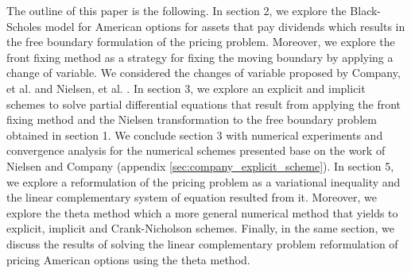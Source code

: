 The outline of this paper is the following. In section 2, we explore the 
Black-Scholes model for American options for assets that pay dividends which results in the free boundary formulation of the pricing problem. Moreover, we explore the front fixing method as a strategy for fixing the moving boundary by applying a change of variable. We considered the changes of variable proposed by Company, et al. \cite*{company_egorova_jodar_2014} and Nielsen, et al. \cite*{nielsen_2001}. In section 3, we explore
an explicit and implicit schemes to solve partial differential equations that 
result from applying the front fixing method and the Nielsen transformation to the free boundary problem obtained in section 1. We conclude section 3 with numerical experiments and convergence analysis for the numerical schemes presented base on the work of Nielsen and Company (appendix \ref{sec:company_explicit_scheme}). In section 5, we explore a reformulation of the pricing problem as a variational inequality and the linear complementary system of equation resulted from it. Moreover, we explore the theta method which a more general numerical method that yields to explicit, implicit and Crank-Nicholson schemes. Finally, in the same section, we discuss the results of solving the linear complementary problem reformulation of pricing American options using the theta method.

